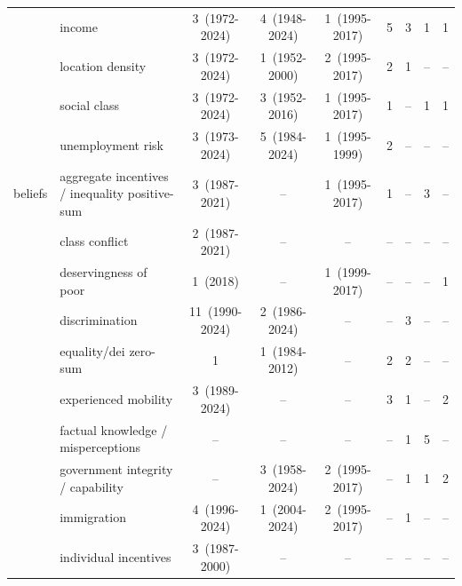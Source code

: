 \documentclass[11pt, headsepline]{article}
\begin{document}
\begin{landscape}
\begin{longtable}{@{}l p{2.6in} ccc cccc@{}}
 & income & 3~(1972-2024) & 4~(1948-2024) & 1~(1995-2017) & 5 & 3 & 1 & 1 \\
 & location density & 3~(1972-2024) & 1~(1952-2000) & 2~(1995-2017) & 2 & 1 & \textcolor[gray]{0.62}{--} & \textcolor[gray]{0.62}{--} \\
 & social class & 3~(1972-2024) & 3~(1952-2016) & 1~(1995-2017) & 1 & \textcolor[gray]{0.62}{--} & 1 & 1 \\
 & unemployment risk & 3~(1973-2024) & 5~(1984-2024) & 1~(1995-1999) & 2 & \textcolor[gray]{0.62}{--} & \textcolor[gray]{0.62}{--} & \textcolor[gray]{0.62}{--} \\
\addlinespace[2pt]
beliefs & aggregate incentives / inequality positive-sum & 3~(1987-2021) & \textcolor[gray]{0.62}{--} & 1~(1995-2017) & 1 & \textcolor[gray]{0.62}{--} & 3 & \textcolor[gray]{0.62}{--} \\
 & class conflict & 2~(1987-2021) & \textcolor[gray]{0.62}{--} & \textcolor[gray]{0.62}{--} & \textcolor[gray]{0.62}{--} & \textcolor[gray]{0.62}{--} & \textcolor[gray]{0.62}{--} & \textcolor[gray]{0.62}{--} \\
 & deservingness of poor & 1~(2018) & \textcolor[gray]{0.62}{--} & 1~(1999-2017) & \textcolor[gray]{0.62}{--} & \textcolor[gray]{0.62}{--} & \textcolor[gray]{0.62}{--} & 1 \\
 & discrimination & 11~(1990-2024) & 2~(1986-2024) & \textcolor[gray]{0.62}{--} & \textcolor[gray]{0.62}{--} & 3 & \textcolor[gray]{0.62}{--} & \textcolor[gray]{0.62}{--} \\
 & equality/dei zero-sum & 1 & 1~(1984-2012) & \textcolor[gray]{0.62}{--} & 2 & 2 & \textcolor[gray]{0.62}{--} & \textcolor[gray]{0.62}{--} \\
 & experienced mobility & 3~(1989-2024) & \textcolor[gray]{0.62}{--} & \textcolor[gray]{0.62}{--} & 3 & 1 & \textcolor[gray]{0.62}{--} & 2 \\
 & factual knowledge / misperceptions & \textcolor[gray]{0.62}{--} & \textcolor[gray]{0.62}{--} & \textcolor[gray]{0.62}{--} & \textcolor[gray]{0.62}{--} & 1 & 5 & \textcolor[gray]{0.62}{--} \\
 & government integrity / capability & \textcolor[gray]{0.62}{--} & 3~(1958-2024) & 2~(1995-2017) & \textcolor[gray]{0.62}{--} & 1 & 1 & 2 \\
 & immigration & 4~(1996-2024) & 1~(2004-2024) & 2~(1995-2017) & \textcolor[gray]{0.62}{--} & 1 & \textcolor[gray]{0.62}{--} & \textcolor[gray]{0.62}{--} \\
 & individual incentives & 3~(1987-2000) & \textcolor[gray]{0.62}{--} & \textcolor[gray]{0.62}{--} & \textcolor[gray]{0.62}{--} & \textcolor[gray]{0.62}{--} & \textcolor[gray]{0.62}{--} & \textcolor[gray]{0.62}{--} \\

\end{longtable}
\end{landscape}
\end{document}
